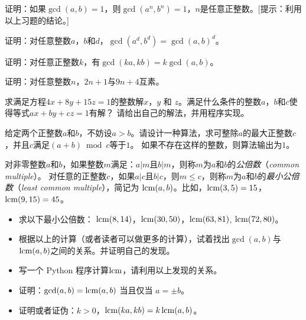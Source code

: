 \begin{problemset}
   \item 证明：如果$\gcd(a,b) =1$，则$\gcd(a^n, b^n) =1$，$n$是任意正整数。[提示：利用以上习题的结论。]
  
  \item 证明：对任意整数$a$，$b$和$d$，$\gcd(a^d, b^d) = \gcd(a,b)^d$。%
  
  \item 证明：对任意正整数$k$，有$\gcd(ka,kb) = k \gcd(a,b)$。%
  
  \item 证明：对任意整数$n$，$2n + 1$与$9n + 4$互素。%
  
  \item 求满足方程$4x + 8y + 15z = 1$的整数解$x$，$y$ 和 $z$。满足什么条件的整数$a$，$b$和$c$使得等式$ax + by + cz = 1$有解？
  请给出自己的解法，并用程序实现。
  
  \item 给定两个正整数$a$和$b$，不妨设$a > b$。请设计一种算法，求可整除$a$的最大正整数$c$，并且$c$满足$(a + b) \bmod c$等于$1$。
  如果不存在这样的整数，则算法输出为$1$。
  
  
  \item 对非零整数$a$和$b$，如果整数$m$满足：$a | m$且$b | m$，则称$m$为$a$和$b$的\emph{公倍数}（\emph{common multiple}）。
  对任意的正整数$c$，如果$a | c$且$b | c$，则$m \leq c$，则称$m$为$a$和$b$的\emph{最小公倍数}（\emph{least common multiple}），简记为
  $\operatorname{lcm}(a, b)$。比如，$\operatorname{lcm}(3, 5) = 15$，$\operatorname{lcm}(9, 15) = 45$。
  \begin{itemize}
   \item 求以下最小公倍数：
      $\operatorname{lcm}(8, 14)$，$\operatorname{lcm}(30, 50)$，$\operatorname{lcm}(63, 81)$, $\operatorname{lcm}(72, 80)$。
       
   \item 根据以上的计算（或者读者可以做更多的计算），试着找出$\gcd(a, b)$与$\operatorname{lcm}(a, b)$之间的关系。并证明自己的发现。
    
   \item 写一个 Python 程序计算$\operatorname{lcm}$，请利用以上发现的关系。
   
   \item 证明：$\gcd(a, b) = \operatorname{lcm}(a, b)$ 当且仅当 $a = \pm b$。
   
   \item 证明或者证伪：$k > 0$，$\operatorname{lcm}(ka, kb) = k \operatorname{lcm}(a, b)$。
  \end{itemize}
  
\end{problemset}